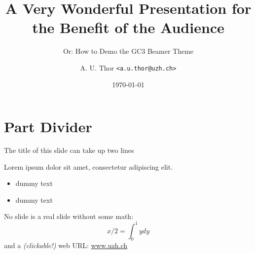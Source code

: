 \documentclass[english,serif,mathserif]{beamer}
\begin{document}
\title[Short Title]{A Very Wonderful Presentation for the Benefit of the Audience}
\subtitle{Or: How to Demo the GC3 Beamer Theme}

\author{A. U. Thor \texttt{<a.u.thor@uzh.ch>}}

\date{\today}

\maketitle

\part{Part Divider}

\begin{frame}{The title of this slide can take up two lines}

Lorem ipsum dolor sit amet, consectetur adipiscing elit.
\begin{itemize}
\item dummy text
\item dummy text
\end{itemize}

No slide is a real slide without some math:
$$x/2 = \int_{0}^{1} ydy$$
and a \emph{(clickable!)} web URL: \url{www.uzh.ch}

\end{frame}
\end{document}
